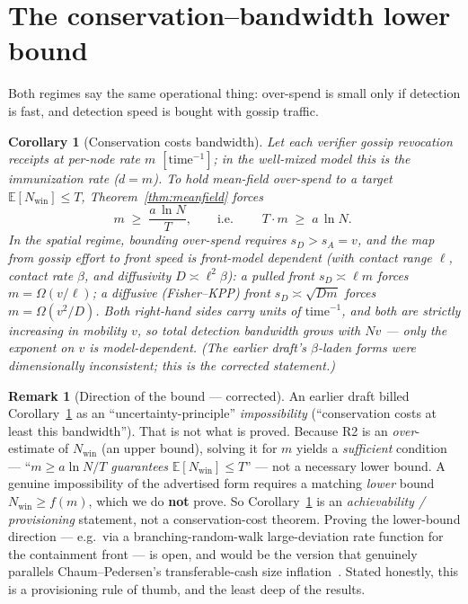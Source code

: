 \documentclass[11pt]{article}
\theoremstyle{plain}
\newtheorem{corollary}{Corollary}
\theoremstyle{definition}
\newtheorem{remark}{Remark}
\newcommand{\Nwin}{N_{\mathrm{win}}}
\newcommand{\E}{\mathbb{E}}
\begin{document}
\section{The conservation--bandwidth lower bound}\label{sec:bandwidth}

Both regimes say the same operational thing: over-spend is small only if detection
is fast, and detection speed is bought with gossip traffic.

\begin{corollary}[Conservation costs bandwidth]\label{cor:bandwidth}
Let each verifier gossip revocation receipts at per-node rate $m$
$[\mathrm{time}^{-1}]$; in the well-mixed model this \emph{is} the immunization rate
($d=m$). To hold mean-field over-spend to a target $\E[\Nwin]\le T$,
Theorem~\ref{thm:meanfield} forces
\[
m \;\ge\; \frac{a\,\ln N}{T},
\qquad\text{i.e.}\qquad
\boxed{\;T\cdot m \;\ge\; a\,\ln N.\;}
\]
In the spatial regime, bounding over-spend requires $s_D>s_A=v$, and the map from
gossip effort to front speed is front-model dependent (with contact range $\ell$,
contact rate $\beta$, and diffusivity $D\asymp\ell^2\beta$): a \emph{pulled} front
$s_D\asymp\ell m$ forces $m=\Omega(v/\ell)$; a \emph{diffusive} (Fisher--KPP) front
$s_D\asymp\sqrt{Dm}$ forces $m=\Omega(v^2/D)$. Both right-hand sides carry units of
$\mathrm{time}^{-1}$, and both are strictly increasing in mobility $v$, so total
detection bandwidth grows with $Nv$ --- only the exponent on $v$ is model-dependent.
(The earlier draft's $\beta$-laden forms were dimensionally inconsistent; this is
the corrected statement.)
\end{corollary}

\begin{remark}[Direction of the bound --- corrected]
An earlier draft billed Corollary~\ref{cor:bandwidth} as an
``uncertainty-principle'' \emph{impossibility} (``conservation costs at least this
bandwidth''). That is not what is proved. Because R2 is an \emph{over}-estimate of
$\Nwin$ (an upper bound), solving it for $m$ yields a \emph{sufficient} condition
--- ``$m\ge a\ln N/T$ \emph{guarantees} $\E[\Nwin]\le T$'' --- not a necessary
lower bound. A genuine impossibility of the advertised form requires a matching
\emph{lower} bound $\Nwin \ge f(m)$, which we do \textbf{not} prove. So
Corollary~\ref{cor:bandwidth} is an \emph{achievability / provisioning} statement,
not a conservation-cost theorem. Proving the lower-bound direction --- e.g.\ via a
branching-random-walk large-deviation rate function for the containment front --- is
open, and would be the version that genuinely parallels Chaum--Pedersen's
transferable-cash size inflation~\cite{ChaumPedersen1992}. Stated honestly, this is
a provisioning rule of thumb, and the least deep of the results.
\end{remark}
\end{document}
